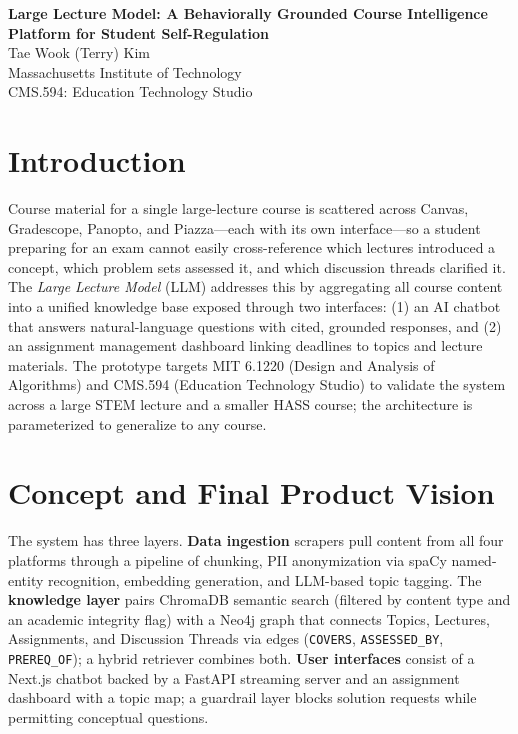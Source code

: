 \documentclass[12pt]{article}
\begin{document}
\begin{center}
  {\bfseries Large Lecture Model: A Behaviorally Grounded Course Intelligence
  Platform for Student Self-Regulation}\\[6pt]
  Tae Wook (Terry) Kim\\
  Massachusetts Institute of Technology\\
  CMS.594: Education Technology Studio
\end{center}

\vspace{6pt}

\section{Introduction}

Course material for a single large-lecture course is scattered across Canvas,
Gradescope, Panopto, and Piazza---each with its own interface---so a student
preparing for an exam cannot easily cross-reference which lectures introduced a
concept, which problem sets assessed it, and which discussion threads clarified
it. The \textit{Large Lecture Model} (LLM) addresses this by aggregating all
course content into a unified knowledge base exposed through two interfaces:
(1) an AI chatbot that answers natural-language questions with cited, grounded
responses, and (2) an assignment management dashboard linking deadlines to
topics and lecture materials. The prototype targets MIT 6.1220 (Design and
Analysis of Algorithms) and CMS.594 (Education Technology Studio) to validate
the system across a large STEM lecture and a smaller HASS course; the
architecture is parameterized to generalize to any course.

\section{Concept and Final Product Vision}

The system has three layers. \textbf{Data ingestion} scrapers pull content from
all four platforms through a pipeline of chunking, PII anonymization via spaCy
named-entity recognition, embedding generation, and LLM-based topic tagging.
The \textbf{knowledge layer} pairs ChromaDB semantic search (filtered by content
type and an academic integrity flag) with a Neo4j graph that connects Topics,
Lectures, Assignments, and Discussion Threads via edges (\texttt{COVERS},
\texttt{ASSESSED\_BY}, \texttt{PREREQ\_OF}); a hybrid retriever combines both.
\textbf{User interfaces} consist of a Next.js chatbot backed by a FastAPI
streaming server and an assignment dashboard with a topic map; a guardrail layer
blocks solution requests while permitting conceptual questions.
\end{document}
